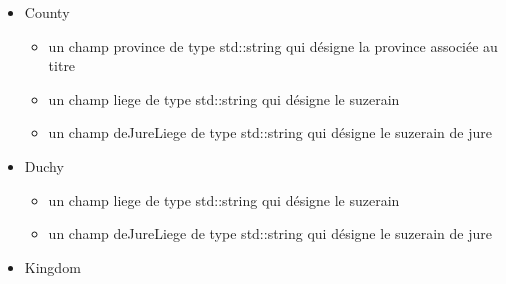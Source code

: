 \documentclass[a4paper,12pt]{article}
\begin{document}
\begin{itemize}
\item County\\
\begin{itemize}
\item un champ province de type std::string qui désigne la province associée au titre
\item un champ liege de type std::string qui désigne le suzerain
\item un champ deJureLiege de type std::string qui désigne le suzerain de jure
\end{itemize}
\item Duchy\\
\begin{itemize}
\item un champ liege de type std::string qui désigne le suzerain
\item un champ deJureLiege de type std::string qui désigne le suzerain de jure
\end{itemize}
\item Kingdom\\


\end{itemize}
\end{document}
